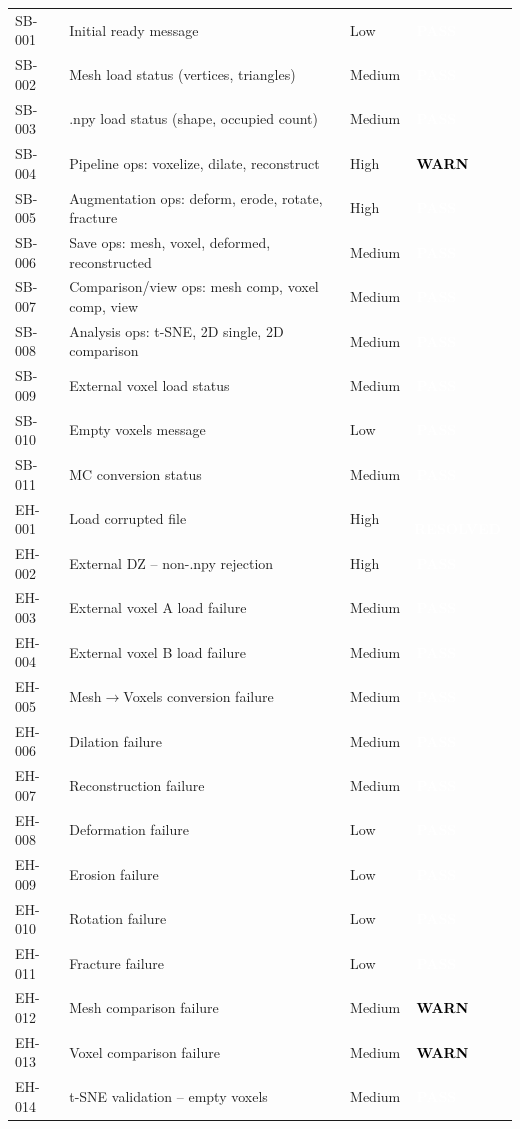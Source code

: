 \documentclass[12pt,a4paper]{article}
\newcommand{\statuspass}{\colorbox{statusgreen}{\textcolor{white}{\textbf{\,PASS\,}}}}
\newcommand{\statuswarn}{\colorbox{statusyellow}{\textcolor{black}{\textbf{\,WARN\,}}}}
\newcommand{\statusresolved}{\colorbox{statusorange}{\textcolor{white}{\textbf{\,RESOLVED\,}}}}
\begin{document}
{\begin{longtable}{p{1.7cm}p{7.7cm}p{1.3cm}p{2cm}}
SB-001 & Initial ready message & Low & \statuspass \\
SB-002 & Mesh load status (vertices, triangles) & Medium & \statuspass \\
SB-003 & .npy load status (shape, occupied count) & Medium & \statuspass \\
SB-004 & Pipeline ops: voxelize, dilate, reconstruct & High & \statuswarn \\
SB-005 & Augmentation ops: deform, erode, rotate, fracture & High & \statuspass \\
SB-006 & Save ops: mesh, voxel, deformed, reconstructed & Medium & \statuspass \\
SB-007 & Comparison/view ops: mesh comp, voxel comp, view & Medium & \statuspass \\
SB-008 & Analysis ops: t-SNE, 2D single, 2D comparison & Medium & \statuspass \\
SB-009 & External voxel load status & Medium & \statuspass \\
SB-010 & Empty voxels message & Low & \statuspass \\
SB-011 & MC conversion status & Medium & \statuspass \\
EH-001 & Load corrupted file & High & \statusresolved \\
EH-002 & External DZ -- non-.npy rejection & High & \statuspass \\
EH-003 & External voxel A load failure & Medium & \statuspass \\
EH-004 & External voxel B load failure & Medium & \statuspass \\
EH-005 & Mesh$\rightarrow$Voxels conversion failure & Medium & \statuspass \\
EH-006 & Dilation failure & Medium & \statuspass \\
EH-007 & Reconstruction failure & Medium & \statuspass \\
EH-008 & Deformation failure & Low & \statuspass \\
EH-009 & Erosion failure & Low & \statuspass \\
EH-010 & Rotation failure & Low & \statuspass \\
EH-011 & Fracture failure & Low & \statuspass \\
EH-012 & Mesh comparison failure & Medium & \statuswarn \\
EH-013 & Voxel comparison failure & Medium & \statuswarn \\
EH-014 & t-SNE validation -- empty voxels & Medium & \statuspass \\

\end{longtable}}
\end{document}
